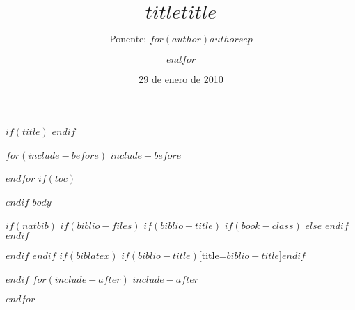 \documentclass[$if(fontsize)$$fontsize$,$endif$$if(handout)$handout,$endif$$if(beamer)$ignorenonframetext,$endif$]{$documentclass$}
\title[$shorttitle$]{$title$}
\title{$title$}
\author[$author$]{Ponente: $for(author)$$author$$sep$ \and $endfor$}
\date{29 de enero de 2010}
\institute[Universidad de La Laguna]{
Entidades participantes en el curso: 

\begin{minipage}{8em}\vspace{0.5cm}
\begin{center}
        \texttt{[image: ../assets/img/logo\_ULL\_color.png]}
\end{center}
\end{minipage}
\begin{minipage}{35em}\vspace{0.5cm}
\begin{center}
      \texttt{[image: ../assets/img/logo\_Fundaciongeneral\_color.png]}
\end{center}
\end{minipage}
\begin{minipage}{8em}\vspace{0.5cm}
\begin{center}
        \texttt{[image: ../assets/img/logo\_istac.jpg]}
\end{center}
\end{minipage}
}
\date{}
\begin{document}
$if(title)$
\frame{\titlepage}
$endif$

$for(include-before)$
$include-before$

$endfor$
$if(toc)$
\begin{frame}
\tableofcontents[hideallsubsections]
\end{frame}

$endif$
$body$

$if(natbib)$
$if(biblio-files)$
$if(biblio-title)$
$if(book-class)$
\renewcommand\bibname{$biblio-title$}
$else$
\renewcommand\refname{$biblio-title$}
$endif$
$endif$


$endif$
$endif$
$if(biblatex)$
\printbibliography$if(biblio-title)$[title=$biblio-title$]$endif$

$endif$
$for(include-after)$
$include-after$

$endfor$
\end{document}
